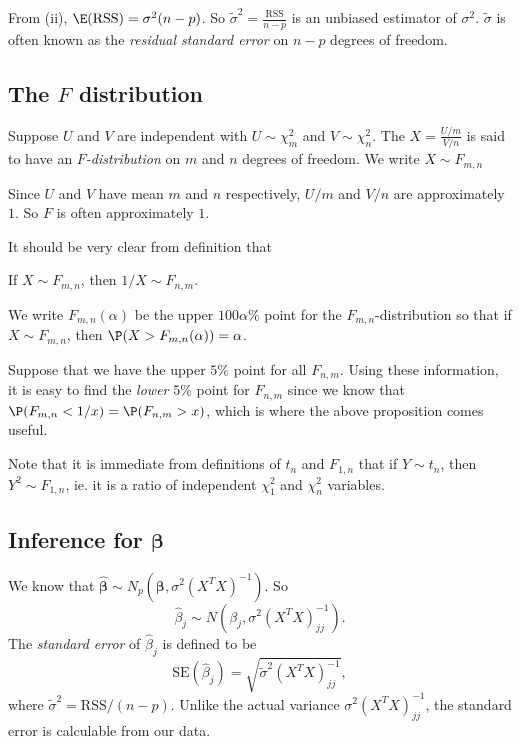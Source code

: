 \documentclass[a4paper]{article}
\begin{document}
From (ii), $\E(\mathrm{RSS}) = \sigma^2(n - p)$. So $\tilde{\sigma}^2 = \frac{\mathrm{RSS}}{n - p}$ is an unbiased estimator of $\sigma^2$. $\tilde{\sigma}$ is often known as the \emph{residual standard error} on $n - p$ degrees of freedom.
\subsection{The \texorpdfstring{$F$}{F} distribution}
\begin{defi}[$F$ distribution]
  Suppose $U$ and $V$ are independent with $U\sim \chi_m^2$ and $V\sim \chi_n^2$. The $X = \frac{U/m}{V/n}$ is said to have an \emph{$F$-distribution} on $m$ and $n$ degrees of freedom. We write $X\sim F_{m, n}$
\end{defi}
Since $U$ and $V$ have mean $m$ and $n$ respectively, $U/m$ and $V/n$ are approximately $1$. So $F$ is often approximately $1$.

It should be very clear from definition that
\begin{prop}
  If $X\sim F_{m, n}$, then $1/X\sim F_{n, m}$.
\end{prop}

We write $F_{m, n}(\alpha)$ be the upper $100\alpha\%$ point for the $F_{m, n}$-distribution so that if $X\sim F_{m, n}$, then $\P(X > F_{m, n}(\alpha)) = \alpha$.

Suppose that we have the upper $5\%$ point for all $F_{n, m}$. Using these information, it is easy to find the \emph{lower} $5\%$ point for $F_{n, m}$ since we know that $\P(F_{m, n} < 1/x) = \P(F_{n, m} > x)$, which is where the above proposition comes useful.

Note that it is immediate from definitions of $t_n$ and $F_{1, n}$ that if $Y\sim t_n$, then $Y^2\sim F_{1, n}$, ie. it is a ratio of independent $\chi_1^2$ and $\chi_n^2$ variables.

\subsection{Inference for \texorpdfstring{$\boldsymbol\beta$}{beta}}
We know that $\hat{\boldsymbol\beta} \sim N_p(\boldsymbol\beta, \sigma^2(X^TX)^{-1})$. So
\[
  \hat{\beta}_j \sim N(\beta_j, \sigma^2(X^TX)^{-1}_{jj}).
\]
The \emph{standard error} of $\hat{\beta}_j$ is defined to be
\[
  \mathrm{SE}(\hat{\beta}_j) = \sqrt{\tilde{\sigma}^2 (X^TX)_{jj}^{-1}},
\]
where $\tilde{\sigma}^2 = \mathrm{RSS}/(n - p)$. Unlike the actual variance $\sigma^2(X^TX)^{-1}_{jj}$, the standard error is calculable from our data.
\end{document}
